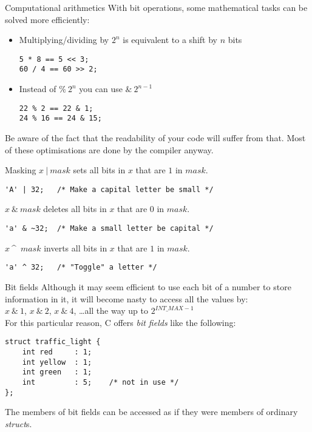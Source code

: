 \begin{frame}[fragile]{Computational arithmetics}
	With bit operations, some mathematical tasks can be solved more efficiently:
	\begin{itemize}
		\item Multiplying/dividing by $2^n$ is equivalent to a shift by $n$ bits
		\begin{lstlisting}
5 * 8 == 5 << 3;
60 / 4 == 60 >> 2;
\end{lstlisting}
		\item Instead of $\%\ 2^n$ you can use $\&\ 2^{n-1}$ 
		\begin{lstlisting}
22 % 2 == 22 & 1;
24 % 16 == 24 & 15;
\end{lstlisting}
	\end{itemize}\bigskip
	Be aware of the fact that the readability of your code will suffer from that. Most of these optimisations are done by the compiler anyway.
\end{frame}
\begin{frame}[fragile]{Masking}
	$x\ |\ mask$ sets all bits in $x$ that are $1$ in $mask$.\\
	\begin{lstlisting}
'A' | 32;	/* Make a capital letter be small */
\end{lstlisting}\bigskip
	$x\ \&\ mask$ deletes all bits in $x$ that are $0$ in $mask$.\\
	\begin{lstlisting}
'a' & ~32;	/* Make a small letter be capital */
\end{lstlisting}\bigskip
	$x\ $\textasciicircum\ $mask$ inverts all bits in $x$ that are $1$ in $mask$.\\
	\begin{lstlisting}
'a' ^ 32;	/* "Toggle" a letter */
\end{lstlisting}
\end{frame}

\begin{frame}[fragile]{Bit fields}
	Although it may seem efficient to use each bit of a number to store information in it, it will become nasty to access all the values by:\\
	$x\ \&\ 1$, $x\ \&\ 2$, $x\ \&\ 4$, \dots all the way up to $2^{INT\_MAX - 1}$\\
	\bigskip
	For this particular reason, C offers \textit{bit fields} like the following:
	\begin{lstlisting}
struct traffic_light {
	int red		: 1;
	int yellow	: 1;
	int green	: 1;
	int			: 5;	/* not in use */
};
\end{lstlisting}
	The members of bit fields can be accessed as if they were members of ordinary \textit{struct}s.

\end{frame}

